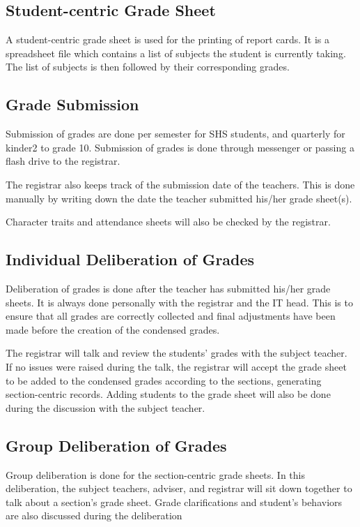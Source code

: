 \documentclass[11pt,a4paper,titlepage]{article}
\begin{document}
\subsection{Student-centric Grade Sheet}
A student-centric grade sheet is used for the printing of report cards. It is a spreadsheet file which contains a list of subjects the student is currently taking. The list of subjects is then followed by their corresponding grades.

\subsection{Grade Submission}

Submission of grades are done per semester for SHS students, and quarterly for kinder2 to grade 10. Submission of grades is done through messenger or passing a flash drive to the registrar.

The registrar also keeps track of the submission date of the teachers. This is done manually by writing down the date the teacher submitted his/her grade sheet(s).

Character traits and attendance sheets will also be checked by the registrar.

\subsection{Individual Deliberation of Grades}
Deliberation of grades is done after the teacher has submitted his/her grade sheets. It is always done personally with the registrar and the IT head. This is to ensure that all grades are correctly collected and final adjustments have been made before the creation of the condensed grades. 

The registrar will talk and review the students' grades with the subject teacher. If no issues were raised during the talk, the registrar will accept the grade sheet to be added to the condensed grades according to the sections, generating section-centric records. Adding students to the grade sheet will also be done during the discussion with the subject teacher. 

\subsection{Group Deliberation of Grades}
Group deliberation is done for the section-centric grade sheets. In this deliberation, the subject teachers, adviser, and registrar will sit down together to talk about a section's grade sheet. Grade clarifications and student's behaviors are also discussed during the deliberation
\end{document}
